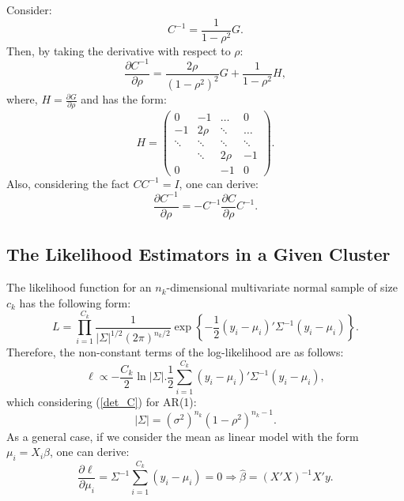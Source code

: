 \documentclass[11pt,a5paper,twoside]{book}
\begin{document}
{Consider:
\begin{equation}
\label{G}
C^{-1}=\frac{1}{1-\rho^2} G.
\end{equation}
Then, by taking the derivative with respect to $\rho$:
\begin{equation}
\label{derivative_c_inv1}
\frac{\partial C^{-1}}{\partial \rho} = \frac{2\rho}{(1-\rho^2)^2}G + \frac{1}{1-\rho^2} H,
\end{equation}
where, $H=\frac{\partial G}{\partial \rho}$ and has the form:
\begin{equation}
\label{H}
H =
 \begin{pmatrix}
  0 & -1 & \ldots & 0 \\
  -1 & 2\rho & \ddots & \ldots \\
  \ddots &   \ddots & \ddots &\ddots  \\
   &\ddots  & 2\rho& -1\\
   0&   &-1& 0
 \end{pmatrix}.
\end{equation}
Also, considering the fact $CC^{-1}=I$, one can derive:
\begin{equation}
\label{derivative_c_inv2}
\frac{\partial C^{-1}}{\partial \rho} = -C^{-1} \frac{\partial C}{\partial \rho} C^{-1}.
\end{equation}

\subsection{The Likelihood Estimators in a Given Cluster}

The likelihood function for an $n_k$-dimensional multivariate normal sample of size $c_k$ has the following form:
\begin{equation}
\label{likelihood_general}
L=\prod_{i=1}^{C_k} \frac{1}{|\Sigma|^{1/2} (2\pi)^{n_k/2}}\exp\left\{ -\frac{1}{2} (y_i-\mu_i )' \Sigma^{-1} (y_i-\mu_i) \right\}.
\end{equation}
Therefore, the non-constant terms of the log-likelihood are as follows:
\begin{equation}
\label{log_general}
\ell \propto -\frac{C_k}{2}\ln |\Sigma|. \frac{1}{2}\sum_{i=1}^{C_k} (y_i-\mu_i)' \Sigma^{-1} (y_i-\mu_i),
\end{equation}
which considering (\ref{det_C}) for AR(1):
\begin{equation}
\label{det_simga}
|\Sigma|=\left(\sigma^2 \right)^{n_k} \left(1-\rho^2 \right)^{n_k-1}.
\end{equation}
As a general case, if we consider the mean as linear model with the form $\mu_i=X_i\beta$, one can derive:
\begin{equation}
\label{betahat}
\frac{\partial \ell}{\partial \mu_i}=\Sigma^{-1} \sum_{i=1}^{C_k} (y_i-\mu_i) =0 \Rightarrow \widehat{\beta}=(X'X)^{-1} X'y.
\end{equation}

}
\end{document}
